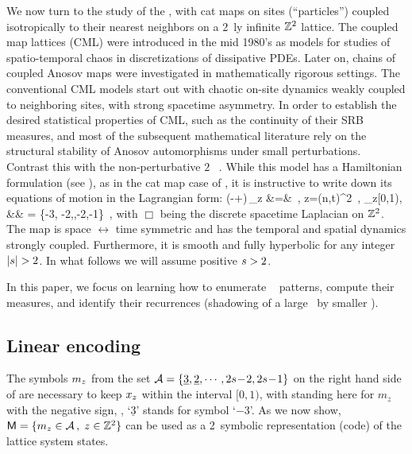 \documentclass[12pt]{iopart}
\begin{document}
We now turn to the study of the {\catlatt} , with cat maps
on sites (``particles'') coupled isotropically to their nearest neighbors on
a 2\dmn\ {\spt}ly infinite $\mathbb{Z}^2$ lattice.
The coupled map lattices (CML) were introduced in the mid 1980's as
models for studies of spatio-temporal chaos in
discretizations of dissipative PDEs. Later on, chains of coupled Anosov
maps were investigated in mathematically rigorous
settings. The conventional CML models start out
with chaotic on-site dynamics weakly coupled to neighboring sites, with
strong spacetime asymmetry. In order to establish the desired
statistical properties of CML, such as the continuity of their {SRB}
measures,  and most of the subsequent
mathematical literature rely on the structural stability of Anosov
automorphisms under small perturbations.
Contrast this with the non-perturbative $2$\dmn\ \GO{}
{\em \catlatt} .
While this model has a Hamiltonian formulation (see
), as in the {cat map} case of
, it is instructive to write down its
equations of motion in the Lagrangian form:
\bea
 (-\Box +)\,\ssp_{z} &=& 
\,,\qquad
 z=(n,t)\in \integers^{2}
\,,
\continue
  \ssp_{z}\in [0,1), \quad  && \in \A
  = \{-3, -2,\cdots,-2,-1\}
\,,
\label{CoupledCats}
\eea
with $\Box $ being the discrete spacetime Laplacian 
on $\mathbb{Z}^2$. The map is space $\leftrightarrow$ time symmetric and
has the temporal and spatial dynamics strongly coupled. Furthermore, it is
smooth and fully hyperbolic for any integer $|s|>\edit{2}$. In what follows we
will assume positive $s>2$.

In this paper, we focus on learning how to enumerate
{\admissible} \catlatt\ {\spt} patterns, compute their measures, and identify
their recurrences (shadowing of a large \twot\ by smaller \twots).


\subsection{Linear encoding}
\label{sect:CCMlinSymDyn}

The symbols ${m_{z}}$ from the set
$\mathcal{A}=\{\underline{3},\underline{2}, \cdots,2s\!-\!2, 2s\!-\!1\}$
on the right hand side of  are necessary to keep
$x_{z}$ within the interval $[0,1)$, with 
standing here for $m_z$ with the negative sign, \ie, `$\underline{3}$'
stands for symbol `$-3$'. As we now show,
\(
\edit{
\Mm= \{\Ssym{z} \in \A \,,\; z\in \integers^2 \}
     }
\)
can be used as a 2\dmn\ symbolic representation (code) of the
lattice system states.
\end{document}
